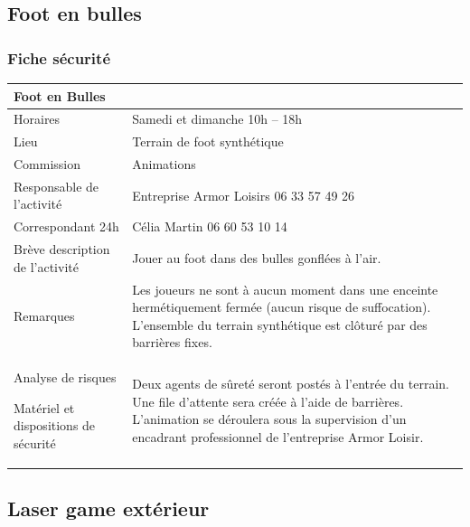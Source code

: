 \documentclass[hidelinks, paper=a4, fontsize=13pt]{report}
\begin{document}
\subsection{Foot en bulles}

\subsubsection{Fiche sécurité}
\begin{center}
\begin{tabular}{ | p{6cm} | p{10cm} | }
\hline
	\multicolumn{2}{|l|}{Foot en Bulles}  \\ \hline
	Horaires & Samedi et dimanche 10h – 18h \\ \hline
	Lieu & Terrain de foot synthétique\\ \hline
	Commission & Animations \\ \hline
	Responsable de l'activité & Entreprise Armor Loisirs 06 33 57 49 26 \\ \hline
	Correspondant 24h & Célia Martin 06 60 53 10 14 \\ \hline
	Brève description de l'activité & Jouer au foot dans des bulles gonflées à l’air. \\ \hline
	Remarques & Les joueurs ne sont à aucun moment dans une enceinte hermétiquement fermée (aucun risque de suffocation). L’ensemble du terrain synthétique est clôturé par des barrières fixes. \\ \hline
	Analyse de risques
	
Matériel et dispositions de sécurité & Deux agents de sûreté seront postés à l’entrée du terrain. Une file d’attente sera créée à l’aide de barrières. L'animation se déroulera sous la supervision d'un encadrant professionnel de l'entreprise Armor Loisir. \\ \hline
\end{tabular}

\end{center}

\subsection{Laser game extérieur}
\end{document}
